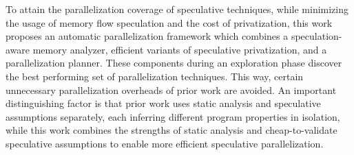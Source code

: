 %

To attain the parallelization coverage of speculative techniques,
while minimizing the usage of memory flow speculation and the cost of
privatization,
%
this work proposes an automatic parallelization framework which
combines a speculation-aware memory analyzer, efficient variants of
speculative privatization, and a parallelization planner. These
components during an exploration phase discover the best performing
set of parallelization techniques. This way, certain unnecessary
parallelization overheads of prior work are avoided.
%
%
%
%
An important distinguishing factor is that prior work uses static
analysis and speculative assumptions separately, each inferring
different program properties in isolation, while this work combines
the strengths of static analysis and cheap-to-validate speculative
assumptions to enable more efficient speculative parallelization.
%
%
%
%

